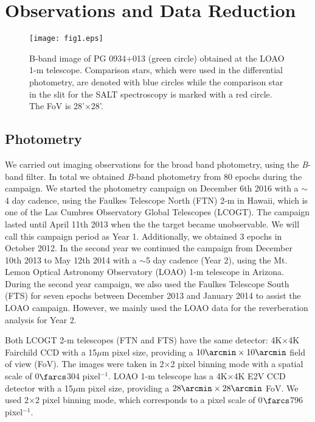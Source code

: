 \documentclass[iop]{emulateapj}
\begin{document}
 
\section{Observations and Data Reduction}

\begin{figure}
	\centering
	\texttt{[image: fig1.eps]}
	\caption{B-band image of PG 0934+013 (green circle) obtained at the LOAO 1-m telescope. Comparison stars, which were used in the differential photometry, are denoted with blue circles while the comparison star in the slit for the SALT spectroscopy is marked with a red circle. The FoV is 28'$\times$28'. 
	}
\end{figure}

\subsection{Photometry}

We carried out imaging observations for the broad band photometry, using the \textit{B}-band filter. In total we obtained \textit{B}-band photometry from 80 epochs during the campaign. We started the photometry campaign on December 6th 2016 with a $\sim$4 day cadence, 
using the Faulkes Telescope North (FTN) 2-m in Hawaii, which is one of the Las Cumbres Observatory Global Telescopes (LCOGT).  
The campaign lasted until April 11th 2013 when the the target became unobservable. We will call this campaign period as Year 1.
Additionally, we obtained 3 epochs in October 2012.
In the second year we continued the campaign from December 10th 2013 to May 12th 2014 with a $\sim$5 day cadence (Year 2), using the Mt. Lemon Optical Astronomy Observatory (LOAO) 1-m telescope in  Arizona. During the second year campaign, we also used the Faulkes Telescope South (FTS) for seven epochs between December 2013 and January 2014 to assist the LOAO campaign. However, we mainly used the LOAO data for the reverberation analysis for Year 2. 

Both LCOGT 2-m telescopes (FTN and FTS) have the same detector: 4K$\times$4K Fairchild CCD with a 15$\mu$m pixel size, providing a $10\arcmin\times10\arcmin$ field of view (FoV). The images were taken in 2$\times$2 pixel binning mode with a spatial scale of 0$\farcs$304 pixel$^{-1}$.
LOAO 1-m telescope has a 4K$\times$4K E2V CCD detector with a 15$\mu$m pixel size, providing a $28\arcmin\times28\arcmin$ FoV. 
We used 2$\times$2 pixel binning mode, which corresponds to a pixel scale of 0$\farcs$796 pixel$^{-1}$. 
\end{document}
